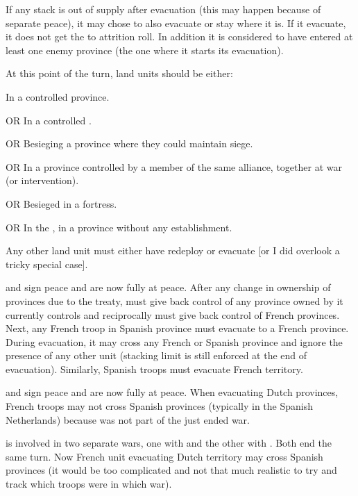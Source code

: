  If any stack is out of supply after
evacuation (this may happen because of separate peace), it may chose to also
evacuate or stay where it is.
\bparag If it evacuate, it does not get the  to attrition roll. In
addition it is considered to have entered at least one enemy province (the one
where it starts its evacuation).

\aparag[Memento]
\bparag At this point of the turn, land units should be either:
\begin{modlist}
\item In a controlled province.
\item[OR] In a controlled \Presidio.
\item[OR] Besieging a province where they could maintain siege.
\item[OR] In a province controlled by a member of the same alliance, together
  at war (or intervention).
\item[OR] Besieged in a fortress.
\item[OR] In the \ROTW, in a province without any establishment.
\end{modlist}
\bparag Any other land unit must either have redeploy or evacuate [or I did
overlook a tricky special case].

\begin{exemple}
  \FRA and \HIS sign peace and are now fully at peace. After any change in
  ownership of provinces due to the treaty, \FRA must give back control of any
  province owned by \HIS it currently controls and reciprocally \HIS must give
  back control of French provinces. Next, any French troop in Spanish province
  must evacuate to a French province. During evacuation, it may cross any
  French or Spanish province and ignore the presence of any other unit
  (stacking limit is still enforced at the end of evacuation). Similarly,
  Spanish troops must evacuate French territory.
\end{exemple}

\begin{exemple}
  \FRA and \HOL sign peace and are now fully at peace. When evacuating Dutch
  provinces, French troops may not cross Spanish provinces (typically in the
  Spanish Netherlands) because \HIS was not part of the just ended war.

  \smallskip

  \FRA is involved in two separate wars, one with \HIS and the other with
  \HOL. Both end the same turn. Now French unit evacuating Dutch territory may
  cross Spanish provinces (it would be too complicated and not that much
  realistic to try and track which troops were in which war).
\end{exemple}

